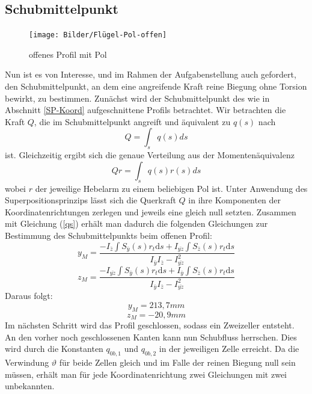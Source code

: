 \subsection{Schubmittelpunkt}
\begin{figure}[h]
	\centering
	\texttt{[image: Bilder/Flügel-Pol-offen]}
	\caption{offenes Profil mit Pol}
	\label{fig:Fluegel2}
\end{figure}
Nun ist es von Interesse, und im Rahmen der Aufgabenstellung auch gefordert, den Schubmittelpunkt, an dem eine angreifende Kraft reine Biegung ohne Torsion bewirkt, zu bestimmen.
Zunächst wird der Schubmittelpunkt des wie in Abschnitt \ref{SP-Koord} aufgeschnittene Profils betrachtet. Wir betrachten die Kraft $Q$, die im Schubmittelpunkt angreift und äquivalent zu $q(s)$ nach
\begin{equation}
	Q=\int_{s}^{}q(s)ds
\end{equation}
ist. Gleichzeitig ergibt sich die genaue Verteilung aus der Momentenäquivalenz 
\begin{equation}
	Qr=\int_{s}q(s)r(s)ds
\end{equation}
wobei $r$ der jeweilige Hebelarm zu einem beliebigen Pol ist. Unter Anwendung des Superpositionsprinzips lässt sich die Querkraft $Q$ in ihre Komponenten der  Koordinatenrichtungen zerlegen und jeweils eine gleich null setzten. Zusammen mit Gleichung (\ref{qs}) erhält man dadurch die folgenden Gleichungen zur Bestimmung des Schubmittelpunkts beim offenen Profil:
\begin{equation}
	y_{M}=\frac{-I_{\bar{z}}\int S_{\bar{y}}(s) r_{t}\mathrm{d}s+I_{\bar{yz}}\int S_{\bar{z}}(s) r_{t}\mathrm{d}s}{I_{\bar{y}}I_{\bar{z}}-I_{\bar{yz}}^2}
\end{equation}
\begin{equation}
	z_{M}=\frac{-I_{\bar{yz}}\int S_{\bar{y}}(s) r_{t}\mathrm{d}s+I_{\bar{y}}\int S_{\bar{z}}(s) r_{t}\mathrm{d}s}{I_{\bar{y}}I_{\bar{z}}-I_{\bar{yz}}^2}
\end{equation}
Daraus folgt:
\begin{equation}
	y_{M}=213,7mm
\end{equation}
\begin{equation}
	z_{M}=-20,9mm
\end{equation}
Im nächsten Schritt wird das Profil geschlossen, sodass ein Zweizeller entsteht. An den vorher noch geschlossenen Kanten kann nun Schubfluss herrschen. Dies wird durch die Konstanten $q_{0b,1}$ und $q_{0b,2}$ in der jeweiligen Zelle erreicht.
Da die Verwindung $\vartheta$ für beide Zellen gleich und im Falle der reinen Biegung null sein müssen, erhält man für jede Koordinatenrichtung zwei Gleichungen mit zwei unbekannten.

